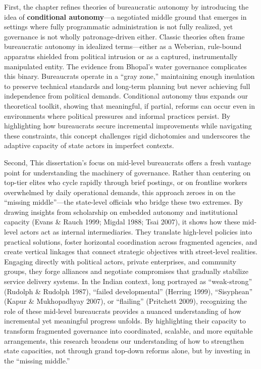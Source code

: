 First, the chapter refines theories of bureaucratic autonomy by introducing the idea of\textbf{ conditional autonomy}—a negotiated middle ground that emerges in settings where fully programmatic administration is not fully realized, yet governance is not wholly patronage-driven either. Classic theories often frame bureaucratic autonomy in idealized terms—either as a Weberian, rule-bound apparatus shielded from political intrusion or as a captured, instrumentally manipulated entity. The evidence from Bhopal’s water governance complicates this binary. Bureaucrats operate in a “gray zone,” maintaining enough insulation to preserve technical standards and long-term planning but never achieving full independence from political demands. Conditional autonomy thus expands our theoretical toolkit, showing that meaningful, if partial, reforms can occur even in environments where political pressures and informal practices persist. By highlighting how bureaucrats secure incremental improvements while navigating these constraints, this concept challenges rigid dichotomies and underscores the adaptive capacity of state actors in imperfect contexts.

Second, This dissertation’s focus on mid-level bureaucrats offers a fresh vantage point for understanding the machinery of governance. Rather than centering on top-tier elites who cycle rapidly through brief postings, or on frontline workers overwhelmed by daily operational demands, this approach zeroes in on the “missing middle”—the state-level officials who bridge these two extremes. By drawing insights from scholarship on embedded autonomy and institutional capacity (Evans \& Rauch 1999; Migdal 1988; Tsai 2007), it shows how these mid-level actors act as internal intermediaries. They translate high-level policies into practical solutions, foster horizontal coordination across fragmented agencies, and create vertical linkages that connect strategic objectives with street-level realities. Engaging directly with political actors, private enterprises, and community groups, they forge alliances and negotiate compromises that gradually stabilize service delivery systems. In the Indian context, long portrayed as “weak-strong” (Rudolph & Rudolph 1987), “failed developmental” (Herring 1999), “Sisyphean” (Kapur & Mukhopadhyay 2007), or “flailing” (Pritchett 2009), recognizing the role of these mid-level bureaucrats provides a nuanced understanding of how incremental yet meaningful progress unfolds. By highlighting their capacity to transform fragmented governance into coordinated, scalable, and more equitable arrangements, this research broadens our understanding of how to strengthen state capacities, not through grand top-down reforms alone, but by investing in the “missing middle.”


